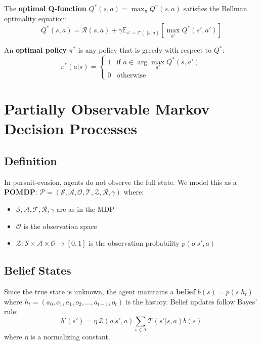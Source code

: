 \documentclass[11pt,a4paper]{report}
\begin{document}
The \textbf{optimal Q-function} $Q^*(s,a) = \max_\pi Q^\pi(s,a)$ satisfies the Bellman optimality equation:
\begin{equation}
    Q^*(s,a) = \mathcal{R}(s,a) + \gamma \mathbb{E}_{s' \sim \mathcal{T}(\cdot|s,a)}\left[ \max_{a'} Q^*(s', a') \right]
\end{equation}

An \textbf{optimal policy} $\pi^*$ is any policy that is greedy with respect to $Q^*$:
\begin{equation}
    \pi^*(a|s) = \begin{cases} 1 & \text{if } a \in \arg\max_{a'} Q^*(s,a') \\ 0 & \text{otherwise} \end{cases}
\end{equation}

\section{Partially Observable Markov Decision Processes}

\subsection{Definition}

In pursuit-evasion, agents do not observe the full state. We model this as a \textbf{POMDP}: $\mathcal{P} = (\mathcal{S}, \mathcal{A}, \mathcal{O}, \mathcal{T}, \mathcal{Z}, \mathcal{R}, \gamma)$ where:
\begin{itemize}
    \item $\mathcal{S}, \mathcal{A}, \mathcal{T}, \mathcal{R}, \gamma$ are as in the MDP
    \item $\mathcal{O}$ is the observation space
    \item $\mathcal{Z}: \mathcal{S} \times \mathcal{A} \times \mathcal{O} \to [0,1]$ is the observation probability $p(o | s', a)$
\end{itemize}

\subsection{Belief States}

Since the true state is unknown, the agent maintains a \textbf{belief} $b(s) = p(s | h_t)$ where $h_t = (a_0, o_1, a_1, o_2, \ldots, a_{t-1}, o_t)$ is the history. Belief updates follow Bayes' rule:
\begin{equation}
    b'(s') = \eta \, \mathcal{Z}(o | s', a) \sum_{s \in \mathcal{S}} \mathcal{T}(s' | s, a) b(s)
\end{equation}
where $\eta$ is a normalizing constant.
\end{document}
